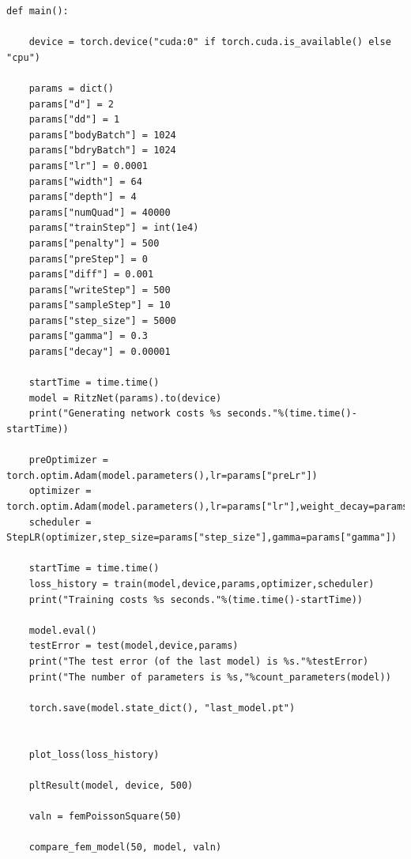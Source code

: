 \documentclass[a4paper,11pt,spanish, twoside, leqno]{tfg-uam}
\theoremstyle{definition}
\begin{document}
\begin{lstlisting}
def main():
    
    device = torch.device("cuda:0" if torch.cuda.is_available() else "cpu")

    params = dict()
    params["d"] = 2 
    params["dd"] = 1 
    params["bodyBatch"] = 1024 
    params["bdryBatch"] = 1024 
    params["lr"] = 0.0001 
    params["width"] = 64 
    params["depth"] = 4 
    params["numQuad"] = 40000 
    params["trainStep"] = int(1e4)
    params["penalty"] = 500
    params["preStep"] = 0
    params["diff"] = 0.001
    params["writeStep"] = 500
    params["sampleStep"] = 10
    params["step_size"] = 5000
    params["gamma"] = 0.3
    params["decay"] = 0.00001

    startTime = time.time()
    model = RitzNet(params).to(device)
    print("Generating network costs %s seconds."%(time.time()-startTime))

    preOptimizer = torch.optim.Adam(model.parameters(),lr=params["preLr"])
    optimizer = torch.optim.Adam(model.parameters(),lr=params["lr"],weight_decay=params["decay"])
    scheduler = StepLR(optimizer,step_size=params["step_size"],gamma=params["gamma"])

    startTime = time.time()
    loss_history = train(model,device,params,optimizer,scheduler)
    print("Training costs %s seconds."%(time.time()-startTime))

    model.eval()
    testError = test(model,device,params)
    print("The test error (of the last model) is %s."%testError)
    print("The number of parameters is %s,"%count_parameters(model))

    torch.save(model.state_dict(), "last_model.pt")

    
    plot_loss(loss_history)

    pltResult(model, device, 500)

    valn = femPoissonSquare(50)

    compare_fem_model(50, model, valn)
\end{lstlisting}


\printbibliography
\cleardoublepage
\end{document}
